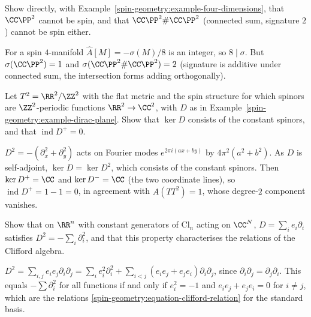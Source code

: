 \begin{exercise}\label{spin-geometry:exercise-a-hat-cp2}
Show directly, with Example~\ref{spin-geometry:example-four-dimensions}, that $\CC\PP^2$ cannot be spin, and that $\CC\PP^2 \# \CC\PP^2$ (connected sum, signature $2$) cannot be spin either.
\end{exercise}

\begin{solution}
For a spin $4$-manifold $\hat{A}[M] = -\sigma(M)/8$ is an integer, so $8 \mid \sigma$. But $\sigma(\CC\PP^2) = 1$ and $\sigma(\CC\PP^2 \# \CC\PP^2) = 2$ (signature is additive under connected sum, the intersection forms adding
orthogonally).
\end{solution}

\begin{exercise}\label{spin-geometry:exercise-torus-dirac}
Let $T^2 = \RR^2/\ZZ^2$ with the flat metric and the spin structure for which spinors are $\ZZ^2$-periodic functions $\RR^2 \to \CC^2$, with $D$ as in Example~\ref{spin-geometry:example-dirac-plane}. Show that $\ker D$
consists of the constant spinors, and that $\operatorname{ind}D^+ = 0$.
\end{exercise}

\begin{solution}
$D^2 = -(\partial_x^2 + \partial_y^2)$ acts on Fourier modes $e^{2\pi i(ax + by)}$ by $4\pi^2(a^2 + b^2)$. As $D$ is self-adjoint, $\ker D = \ker D^2$, which consists of the constant spinors. Then
$\ker D^+ = \CC$ and $\ker D^- = \CC$ (the two coordinate lines), so $\operatorname{ind}D^+ = 1 - 1 = 0$, in agreement with $\hat{A}(TT^2) = 1$, whose degree-$2$ component vanishes.
\end{solution}

\begin{exercise}\label{spin-geometry:exercise-dirac-square-flat}
Show that on $\RR^n$ with constant generators of $\mathrm{Cl}_n$ acting on $\CC^N$, $D = \sum_ie_i\partial_i$ satisfies $D^2 = -\sum_i\partial_i^2$, and that this property characterises the relations of the Clifford algebra.
\end{exercise}

\begin{solution}
$D^2 = \sum_{i,j}e_ie_j\partial_i\partial_j = \sum_ie_i^2\partial_i^2 + \sum_{i<j}(e_ie_j + e_je_i)\partial_i\partial_j$, since $\partial_i\partial_j = \partial_j\partial_i$. This equals $-\sum\partial_i^2$ for all functions if and only if
$e_i^2 = -1$ and $e_ie_j + e_je_i = 0$ for $i \neq j$, which are the relations \eqref{spin-geometry:equation-clifford-relation} for the standard basis.
\end{solution}
